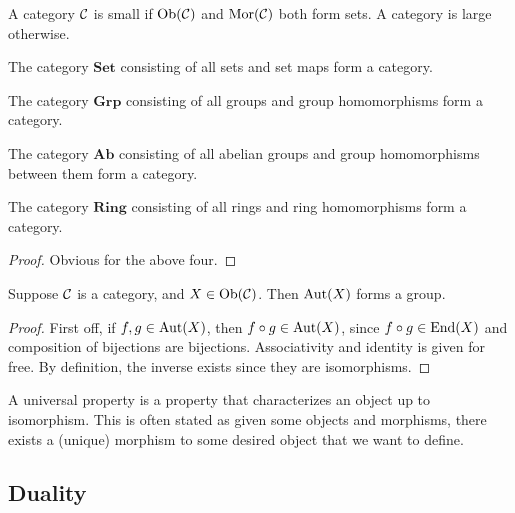 \begin{definition}
    A category \(\mathcal{C}\) is small
    if \(\operatorname{Ob}(\mathcal{C})\) and \(\operatorname{Mor}(\mathcal{C})\) both form sets.
    A category is large otherwise.
\end{definition}

\begin{proposition}
    The category \(\mathbf{Set}\) consisting of all sets and set maps form a category.
\end{proposition}
\begin{proposition}
    The category \(\mathbf{Grp}\) consisting of all groups and group homomorphisms
    form a category.
\end{proposition}
\begin{proposition}
    The category \(\mathbf{Ab}\) consisting of all abelian groups
    and group homomorphisms between them form a category.
\end{proposition}
\begin{proposition}
    The category \(\mathbf{Ring}\) consisting of all rings and ring homomorphisms
    form a category.
\end{proposition}
\begin{proof}
    Obvious for the above four.
\end{proof}

\begin{theorem}
    Suppose \(\mathcal{C}\) is a category, and \(X \in \operatorname{Ob}(\mathcal{C})\).
    Then \(\operatorname{Aut}(X)\) forms a group.
\end{theorem}
\begin{proof}
    First off, if \(f,g \in \operatorname{Aut}(X)\),
    then \(f \circ g \in \operatorname{Aut}(X)\),
    since \(f \circ g \in \operatorname{End}(X)\) and composition of bijections are bijections.
    Associativity and identity is given for free.
    By definition, the inverse exists since they are isomorphisms.
\end{proof}

\begin{definition}
    A universal property is a property
    that characterizes an object up to isomorphism.
    This is often stated as given some objects and morphisms,
    there exists a (unique) morphism to some desired object that we want to define.
\end{definition}


\subsection{Duality}

